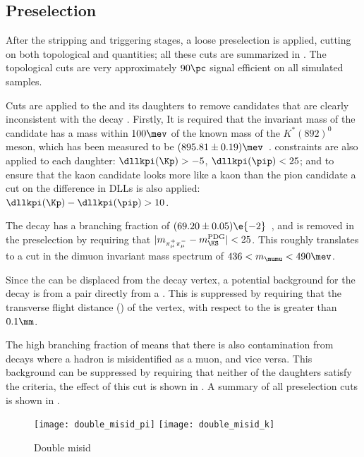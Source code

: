 \subsection{Preselection}
After the stripping and triggering stages, a loose preselection is applied, cutting on both
topological and \pid quantities; all these cuts are summarized in .
The topological cuts are very approximately $90\pc$ signal efficient on all simulated samples.

Cuts are applied to the \Kstar and its daughters to remove candidates that are clearly
inconsistent with the decay  \decay{\Kstarz}{\kpi}.
Firstly, It is required that the invariant mass of the \decay{\Kstarz}{\kpi} candidate has a mass
within $100\mev$ of the known mass of the $K^*(892)^0$ meson, which has been measured to be
$(895.81\pm0.19)\mev$~\cite{PDG2014}.
\pid constraints are also applied to each \Kstar daughter: $\dllkpi(\Kp)>-5$, $\dllkpi(\pip)<25$;
and to ensure that the kaon candidate looks more like a kaon than the pion candidate a cut on the
difference in \glspl{DLL} is also applied: $\dllkpi(\Kp)-\dllkpi(\pip)>10$.

The decay \decay{\KS}{\pipi} has a branching fraction of
$(69.20\pm0.05)\e{-2}$~\cite{PDG2014}, and is removed in the preselection by requiring that
$|m_{\pi_\mu^+\pi_\mu^-}-m_{\KS}^\mathrm{PDG}|<25$.
This roughly translates to a cut in the dimuon invariant mass spectrum of
$436<m_{\mumu}<490\mev$.

Since the \db can be displaced from the \Bd decay vertex, a potential background for the decay
\dbtomumu is from a \mumu pair directly from a \pv.
This is suppressed by requiring that the transverse flight distance (\FDT) of the \db vertex, with
respect to the \pv is greater than $0.1\mm$.

The high branching fraction of \decay{\Bd}{\jpsi(\to\mumu)\Kstarz} means that there is also
contamination from decays where a hadron is misidentified as a muon, and vice versa.
This background can be suppressed by requiring that neither of the \Kstarz daughters satisfy the
\ismuon criteria, the effect of this cut is shown in .
A summary of all preselection cuts is shown in .

\begin{figure}
  \begin{center}
    \texttt{[image: double\_misid\_pi]}
    \texttt{[image: double\_misid\_k]}
    \caption[Effect of the double misidentification veto]
    {
      Double misid
    }
    \label{fig:db:doublemisid}
  \end{center}
\end{figure}

